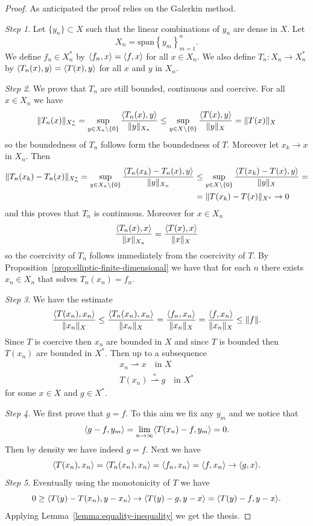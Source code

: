 \documentclass[a4paper,10pt,twoside]{amsbook}
\numberwithin{section}{chapter}
\numberwithin{equation}{chapter}
\theoremstyle{definition}
\DeclarePairedDelimiter{\norm}{\lVert}{\rVert}
\DeclarePairedDelimiter{\dual}{\langle}{\rangle}
\begin{document}
\begin{proof}
As anticipated the proof relies on the Galerkin method.

\emph{Step 1}. Let $\{y_n\}\subset X$ such that the linear combinations of $y_n$ are dense in $X$. Let
\[
X_n=\text{span}\left\{y_m\right\}_{m=1}^n.
\]
We define $f_n\in X_n^*$ by $\dual{f_n,x}=\dual{f,x}$ for all $x\in X_n$. We also define $T_n\colon X_n\to X_n^*$ by $\dual{T_n(x),y}=\dual{T(x),y}$ for all $x$ and $y$ in $X_n$.

\emph{Step 2}. We prove that $T_n$ are still bounded, continuous and coercive. For all $x\in X_n$ we have
\[
\norm{T_n(x)}_{X_n^*}=\sup_{y\in X_n\setminus\{0\}}\frac{\dual{T_n(x),y}}{\norm{y}_{X_n}}\le\sup_{y\in X\setminus\{0\}}\frac{\dual{T(x),y}}{\norm{y}_X}=\norm{T(x)}_X
\]
so the boundedness of $T_n$ follows form the boundedness of $T$. Moreover let $x_k\to x$ in $X_n$. Then
\[
\begin{split}
\norm{T_n(x_k)-T_n(x)}_{X_n^*}=\sup_{y\in X_n\setminus\{0\}}\frac{\dual{T_n(x_k)-T_n(x),y}}{\norm{y}_{X_n}}&\le\sup_{y\in X\setminus\{0\}}\frac{\dual{T(x_k)-T(x),y}}{\norm{y}_X}=\\
&=\norm{T(x_k)-T(x)}_{X^*}\to0
\end{split}
\]
and this proves that $T_n$ is continuous. Moreover for $x\in X_n$
\[
\frac{\dual{T_n(x),x}}{\norm{x}_{X_n}}=\frac{\dual{T(x),x}}{\norm{x}_{X}}
\]
so the coercivity of $T_n$ follows immediately from the coercivity of $T$. By Proposition~\ref{prop:elliptic-finite-dimensional} we have that for each $n$ there exists $x_n\in X_n$ that solves $T_n(x_n)=f_n$.

\emph{Step 3}. We have the estimate
\[
\frac{\dual{T(x_n),x_n}}{\norm{x_n}_X}\le\frac{\dual{T_n(x_n),x_n}}{\norm{x_n}_X}=\frac{\dual{f_n,x_n}}{\norm{x_n}_X}=\frac{\dual{f,x_n}}{\norm{x_n}_X}\le\norm{f}.
\]
Since $T$ is coercive then $x_n$ are bounded in $X$ and since $T$ is bounded then $T(x_n)$ are bounded in $X^*$. Then up to a subsequence
\begin{gather*}
x_n\rightharpoonup x\quad\text{in $X$} \\
T(x_n)\overset{*}{\rightharpoonup}g\quad\text{in $X^*$}
\end{gather*}
for some $x\in X$ and $g\in X^*$.

\emph{Step 4}. We first prove that $g=f$. To this aim we fix any $y_m$ and we notice that
\[
\dual{g-f,y_m}=\lim_{n\to\infty}\dual{T(x_n)-f,y_m}=0.
\]
Then by density we have indeed $g=f$. Next we have
\[
\dual{T(x_n),x_n}=\dual{T_n(x_n),x_n}=\dual{f_n,x_n}=\dual{f,x_n}\to\dual{g,x}.
\]
\emph{Step 5}. Eventually using the monotonicity of $T$ we have
\[
0\ge\dual{T(y)-T(x_n),y-x_n}\to\dual{T(y)-g,y-x}=\dual{T(y)-f,y-x}.
\]
Applying Lemma~\ref{lemma:equality-inequality} we get the thesis.
\end{proof}
\end{document}
